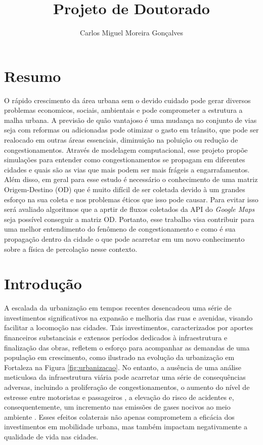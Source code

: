 \documentclass{article}
\title{Projeto de Doutorado}
\author{Carlos Miguel Moreira Gonçalves}
\begin{document}
\maketitle

\section{Resumo}

O rápido crescimento da área urbana sem o devido cuidado pode gerar diversos problemas economicos, sociais, ambientais e pode comprometer a estrutura a malha urbana. A previsão de quão vantajoso é uma mudança no conjunto de vias seja com reformas ou adicionadas pode otimizar o gasto em trânsito, que pode ser realocado em outras áreas essenciais, diminuição na poluição ou redução de congestionamentos. Através de modelagem computacional, esse projeto propõe simulações para entender como congestionamentos se propagam em diferentes cidades e quais são as vias que mais podem ser mais frágeis a engarrafamentos. Além disso, em geral para esse estudo é necessário o conhecimento de uma matriz Origem-Destino (OD) que é muito difícil de ser coletada devido à um grandes esforço na sua coleta e nos problemas éticos que isso pode causar. Para evitar isso será avaliado algoritmos que a aprtir de fluxos coletados da API do \textit{Google Maps} seja possível conseguir a matriz OD. Portanto, esse trabalho visa contribuir para uma melhor entendimento do fenômeno de congestionamento e como é sua propagação dentro da cidade o que pode acarretar em um novo conhecimento sobre a física de percolação nesse contexto.

\newpage

\section{Introdução}



A escalada da urbanização \cite{urbanization} em tempos recentes desencadeou uma série de investimentos significativos na expansão e melhoria das ruas e avenidas, visando facilitar a locomoção nas cidades. Tais investimentos, caracterizados por aportes financeiros substanciais e extensos períodos dedicados à infraestrutura e finalização das obras, refletem o esforço para acompanhar as demandas de uma população em crescimento, como ilustrado na evolução da urbanização em Fortaleza na Figura \ref{fig:urbanizacao}. No entanto, a ausência de uma análise meticulosa da infraestrutura viária pode acarretar uma série de consequências adversas, incluindo a proliferação de congestionamentos, o aumento do nível de estresse entre motoristas e passageiros \cite{Hegewald2020,Adli2017}, a elevação do risco de acidentes e, consequentemente, um incremento nas emissões de gases nocivos ao meio ambiente \citep{Wang2018}. Esses efeitos colaterais não apenas comprometem a eficácia dos investimentos em mobilidade urbana, mas também impactam negativamente a qualidade de vida nas cidades.
\end{document}
